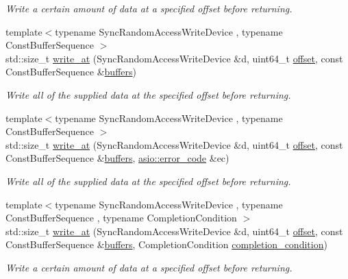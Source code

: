 \begin{DoxyCompactItemize}
\begin{DoxyCompactList}\small\item\em Write a certain amount of data at a specified offset before returning. \end{DoxyCompactList}\item 
{\footnotesize template$<$typename Sync\+Random\+Access\+Write\+Device , typename Const\+Buffer\+Sequence $>$ }\\std\+::size\+\_\+t \hyperlink{group__write__at_gadd67a05a29d183782491d14aceec7d41}{write\+\_\+at} (Sync\+Random\+Access\+Write\+Device \&d, uint64\+\_\+t \hyperlink{group__async__read__at_ga8dcdb41a4adfd6fe5322b5dd666d9f29}{offset}, const Const\+Buffer\+Sequence \&\hyperlink{group__async__read_ga54dede45c3175148a77fe6635222c47d}{buffers})
\begin{DoxyCompactList}\small\item\em Write all of the supplied data at the specified offset before returning. \end{DoxyCompactList}\item 
{\footnotesize template$<$typename Sync\+Random\+Access\+Write\+Device , typename Const\+Buffer\+Sequence $>$ }\\std\+::size\+\_\+t \hyperlink{group__write__at_ga8c1abcb5870505ea2a0c524a59638da0}{write\+\_\+at} (Sync\+Random\+Access\+Write\+Device \&d, uint64\+\_\+t \hyperlink{group__async__read__at_ga8dcdb41a4adfd6fe5322b5dd666d9f29}{offset}, const Const\+Buffer\+Sequence \&\hyperlink{group__async__read_ga54dede45c3175148a77fe6635222c47d}{buffers}, \hyperlink{classasio_1_1error__code}{asio\+::error\+\_\+code} \&ec)
\begin{DoxyCompactList}\small\item\em Write all of the supplied data at the specified offset before returning. \end{DoxyCompactList}\item 
{\footnotesize template$<$typename Sync\+Random\+Access\+Write\+Device , typename Const\+Buffer\+Sequence , typename Completion\+Condition $>$ }\\std\+::size\+\_\+t \hyperlink{group__write__at_ga3e6b2f5dd13f4273695fbf0cdec0314a}{write\+\_\+at} (Sync\+Random\+Access\+Write\+Device \&d, uint64\+\_\+t \hyperlink{group__async__read__at_ga8dcdb41a4adfd6fe5322b5dd666d9f29}{offset}, const Const\+Buffer\+Sequence \&\hyperlink{group__async__read_ga54dede45c3175148a77fe6635222c47d}{buffers}, Completion\+Condition \hyperlink{group__async__read_gae2e215d5013596cc2b385bb6c13fa518}{completion\+\_\+condition})
\begin{DoxyCompactList}\small\item\em Write a certain amount of data at a specified offset before returning. \end{DoxyCompactList}\item 

\end{DoxyCompactItemize}
